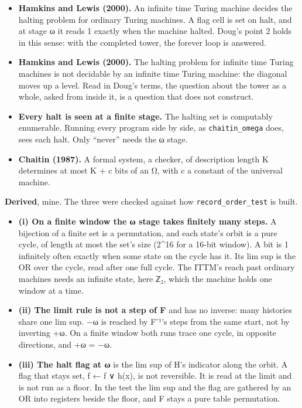 \begin{itemize}
\item \textbf{Hamkins and Lewis (2000).} An infinite time Turing machine decides the halting problem for ordinary Turing machines. A flag cell is set on halt, and at stage ω it reads 1 exactly when the machine halted. Doug's point 2 holds in this sense: with the completed tower, the forever loop is answered.
\item \textbf{Hamkins and Lewis (2000).} The halting problem for infinite time Turing machines is not decidable by an infinite time Turing machine: the diagonal moves up a level. Read in Doug's terms, the question about the tower as a whole, asked from inside it, is a question that does not construct.
\item \textbf{Every halt is seen at a finite stage.} The halting set is computably enumerable. Running every program side by side, as \texttt{chaitin\_\allowbreak{}omega} does, sees each halt. Only “never” needs the ω stage.
\item \textbf{Chaitin (1987).} A formal system, a checker, of description length K determines at most K + c bits of an Ω, with c a constant of the universal machine.
\end{itemize}

\textbf{Derived}, mine. The three were checked against how \texttt{record\_\allowbreak{}order\_\allowbreak{}test} is built.

\begin{itemize}
\item \textbf{(i) On a finite window the ω stage takes finitely many steps.} A bijection of a finite set is a permutation, and each state's orbit is a pure cycle, of length at most the set's size (2\textasciicircum{}16 for a 16-bit window). A bit is 1 infinitely often exactly when some state on the cycle has it. Its lim sup is the OR over the cycle, read after one full cycle. The ITTM's reach past ordinary machines needs an infinite state, here ℤ₂, which the machine holds one window at a time.
\item \textbf{(ii) The limit rule is not a step of F} and has no inverse: many histories share one lim sup. −ω is reached by F⁻¹'s steps from the same start, not by inverting +ω. On a finite window both runs trace one cycle, in opposite directions, and +ω = −ω.
\item \textbf{(iii) The halt flag at ω} is the lim sup of H's indicator along the orbit. A flag that stays set, f ← f ∨ h(x), is not reversible. It is read at the limit and is not run as a floor. In the test the lim sup and the flag are gathered by an OR into registers beside the floor, and F stays a pure table permutation.
\end{itemize}

